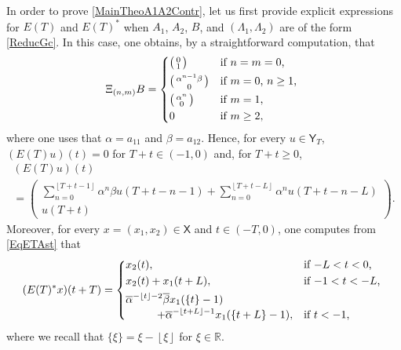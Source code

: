 \documentclass[JEP,XML,SOM,Unicode]{cedram}
\newenvironment{smallpmatrix}{\big(\begin{smallmatrix}}{\end{smallmatrix}\big)}
\theoremstyle{plain}
\theoremstyle{definition}
\newcommand{\floor}[1]{\left\lfloor #1 \right\rfloor}
\begin{document}
In order to prove \eqref{MainTheoA1A2Contr}, let us first provide explicit expressions for $E(T)$ and $E(T)^\ast$ when $A_1$, $A_2$, $B$, and $(\Lambda_1, \Lambda_2)$ are of the form \eqref{ReducGc}. In this case, one obtains, by a straightforward computation, that
\begin{equation}%
\Xi_{(n, m)} B =
\begin{dcases*}
\begin{smallpmatrix}0 \\ 1 \\\end{smallpmatrix} & if $n = m = 0$, \\
\begin{smallpmatrix}\alpha^{n-1} \beta \\ 0 \\\end{smallpmatrix} & if $m = 0$, $n \geq 1$, \\
\begin{smallpmatrix}\alpha^{n} \\ 0 \\\end{smallpmatrix} & if $m = 1$, \\
0 & if $m \geq 2$,
\end{dcases*}
\end{equation}
where one uses that $\alpha \!=\! a_{11}$ and $\beta \!=\! a_{12}$. Hence, for every $u \in \mathsf Y_T$, $(E(T) u)(t) \!=\! 0$ for $T + t \in (-1, 0)$ and, for $T + t \geq 0$,
\begin{multline}
\label{Case4ExplicitE}
(E(T) u)(t)\\[-7pt]
= \begin{pmatrix}\displaystyle \sum_{n=0}^{\floor{T + t - 1}} \alpha^{n} \beta u(T + t - n - 1) + \sum_{n=0}^{\floor{T + t - L}} \alpha^n u(T + t - n - L) \\ u(T + t)\end{pmatrix}.
\end{multline}
Moreover, for every $x = (x_1, x_2) \in \mathsf X$ and $t \in (-T, 0)$, one computes from \eqref{EqETAst} that
\begin{equation}
\label{ETAstUtPlusT}
(E(T)^\ast x)(t + T) = \begin{dcases*}
x_2(t), & if $-L < t < 0$, \\
x_2(t) + x_1(t + L), & if $-1 < t < -L$, \\
\overline\alpha^{-\floor{t} - 2} \overline\beta x_1(\{t\} - 1)\\[-3pt]
\hspace*{1cm} + \overline\alpha^{-\floor{t + L} - 1} x_1(\{t + L\} - 1), & if $t < -1$,
\end{dcases*}
\end{equation}
where we recall that $\{\xi\} = \xi - \floor{\xi}$ for $\xi \in \mathbb R$.
\end{document}
